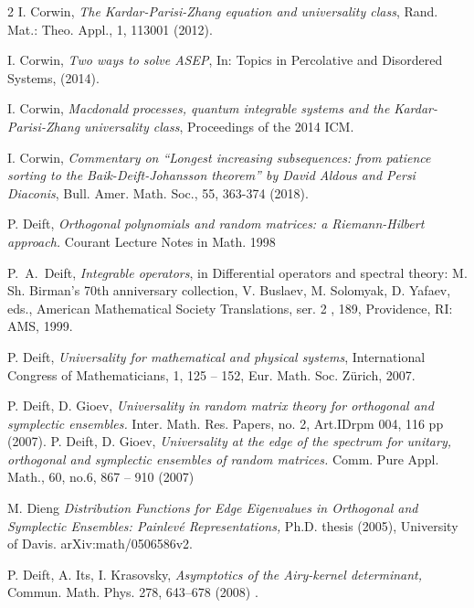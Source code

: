 \documentclass[11pt,letterpaper,reqno]{amsart}
\theoremstyle{definition}
\theoremstyle{remark}
\numberwithin{equation}{section}
\begin{document}
\begin{thebibliography}{2}
 I. Corwin, {\it The Kardar-Parisi-Zhang equation and universality class}, Rand. Mat.: Theo. Appl., 1, 113001 (2012).

 I. Corwin, {\it Two ways to solve ASEP}, In: Topics in Percolative and Disordered Systems, (2014).


 I. Corwin, {\it Macdonald processes, quantum integrable systems and the Kardar-Parisi-Zhang universality class}, Proceedings of the 2014 ICM.

 I. Corwin, {\it Commentary on ``Longest increasing subsequences: from patience sorting to the Baik-Deift-Johansson theorem'' by David Aldous and Persi Diaconis}, Bull. Amer. Math. Soc., 55, 363-374 (2018).







 P. Deift, {\it Orthogonal polynomials and random matrices: a
Riemann-Hilbert approach.} Courant Lecture Notes in Math. 1998

 P.~A.~Deift, {\it Integrable operators}, in Differential operators and
spectral theory: M. Sh. Birman's 70th anniversary collection, V. Buslaev,
M. Solomyak, D. Yafaev, eds., American Mathematical Society Translations,
ser. 2 , 189, Providence, RI: AMS, 1999.

 P. Deift, {\it Universality for mathematical and physical systems},
International Congress of Mathematicians,  1, 125 -- 152, Eur. Math. Soc. Z\"urich, 2007.

 P.  Deift, D.  Gioev, {\it Universality in random matrix theory for orthogonal and symplectic
ensembles.} Inter. Math. Res. Papers, no. 2, Art.IDrpm 004, 116 pp (2007).
 P.  Deift, D.  Gioev, {\it Universality at the edge of the spectrum for unitary, orthogonal
and symplectic ensembles of random matrices.} Comm. Pure Appl. Math.,  60,  no.6,
867 -- 910  (2007)

 M.  Dieng {\it  Distribution Functions for Edge Eigenvalues in Orthogonal and Symplectic Ensembles:
Painlev\'e Representations,}  Ph.D. thesis (2005), University of Davis. arXiv:math/0506586v2.


  P. Deift, A.  Its, I. Krasovsky,
  {\it  Asymptotics of the Airy-kernel determinant,}
 Commun. Math. Phys. 278,  643--678 (2008) .


\end{thebibliography}
\end{document}

